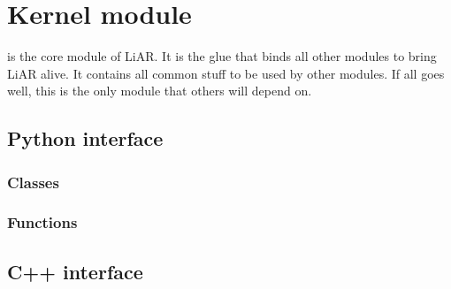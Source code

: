 % 

\chapter{Kernel module}

 is the core module of LiAR.  It is the glue that binds all other modules to bring LiAR alive.  It contains all common stuff to be used by other modules.  If all goes well, this is the only module that others will depend on.

\section{Python interface}

\subsection{Classes}

\subsection{Functions}


\section{C++ interface}